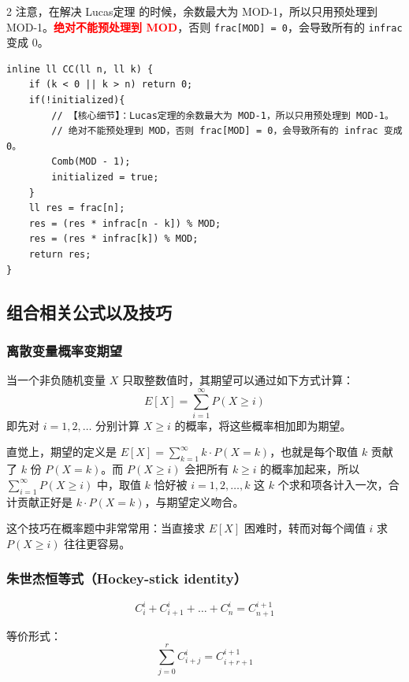 \begin{multicols*}{2}
		注意，在解决 Lucas定理 的时候，余数最大为 MOD-1，所以只用预处理到 MOD-1。\textcolor{red}{\textbf{绝对不能预处理到 MOD}}，否则 \verb|frac[MOD] = 0|，会导致所有的 \verb|infrac| 变成 0。

		\begin{verbatim}
inline ll CC(ll n, ll k) {
	if (k < 0 || k > n) return 0;
	if(!initialized){
		// 【核心细节】：Lucas定理的余数最大为 MOD-1，所以只用预处理到 MOD-1。
		// 绝对不能预处理到 MOD，否则 frac[MOD] = 0，会导致所有的 infrac 变成 0。
		Comb(MOD - 1);
		initialized = true;
	}
	ll res = frac[n];
	res = (res * infrac[n - k]) % MOD;
	res = (res * infrac[k]) % MOD;
	return res;
}
		\end{verbatim}

		\subsection{组合相关公式以及技巧}

		\subsubsection{离散变量概率变期望}

		当一个非负随机变量 $X$ 只取整数值时，其期望可以通过如下方式计算：
		$$E[X] = \sum_{i=1}^{\infty} P(X \ge i)$$
		即先对 $i = 1, 2, \dots$ 分别计算 $X \ge i$ 的概率，将这些概率相加即为期望。

		直觉上，期望的定义是 $E[X] = \sum_{k=1}^{\infty} k \cdot P(X=k)$，也就是每个取值 $k$ 贡献了 $k$ 份 $P(X=k)$。而 $P(X \ge i)$ 会把所有 $k \ge i$ 的概率加起来，所以 $\sum_{i=1}^{\infty} P(X \ge i)$ 中，取值 $k$ 恰好被 $i=1, 2, \dots, k$ 这 $k$ 个求和项各计入一次，合计贡献正好是 $k \cdot P(X=k)$，与期望定义吻合。

		这个技巧在概率题中非常常用：当直接求 $E[X]$ 困难时，转而对每个阈值 $i$ 求 $P(X \ge i)$ 往往更容易。

		\subsubsection{朱世杰恒等式（Hockey-stick identity）}

		$$C_i^i + C_{i+1}^i + \dots + C_n^i = C_{n+1}^{i+1}$$

		等价形式：
		$$\sum_{j=0}^{r} C_{i+j}^{i} = C_{i+r+1}^{i+1}$$


\end{multicols*}
